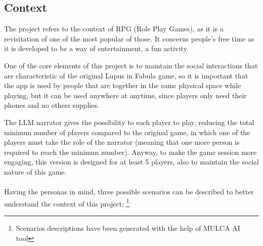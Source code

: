 \documentclass[12pt]{article}
\begin{document}
\subsection{Context}
The project refers to the context of RPG (Role Play Games), as it is a revisitation of one of the most popular of those. It concerns people's free time as it is developed to be a way of entertainment, a fun activity. 

One of the core elements of this project is to maintain the social interactions that are characteristic of the original Lupus in Fabula game, so it is important that the app is used by people that are together in the same physical space while playing, but it can be used anywhere at anytime, since players only need their phones and no others supplies. 

The LLM narrator gives the possibility to each player to play, reducing the total minimun number of players compared to the original game, in which one of the players must take the role of the narrator (meaning that one more person is required to reach the minimun number). Anyway, to make the game session more engaging, this version is designed for at least 5 players, also to maintain the social nature of this game.
\\
\\Having the personas in mind, three possible scenarios can be described to better understand the context of this project:
\footnote{Scenarios descriptions have been generated with the help of MULCA AI tool}
\end{document}
